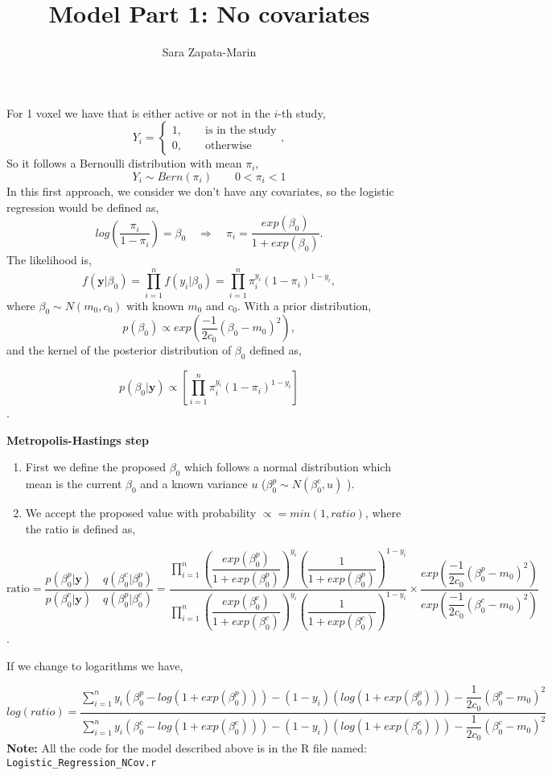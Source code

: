 \documentclass[10pt,a4paper]{article}
\title{Model Part 1: No covariates}
\author{Sara Zapata-Marin}
\begin{document}
\maketitle

For 1 voxel we have that is either active or not in the $i$-th study,
\[ Y_i= 
\begin{cases}
1,\qquad \text{is in the study}\\
0, \qquad \text{otherwise}
\end{cases},
\]
So it follows a Bernoulli distribution with mean $\pi_i$,
\[Y_i \sim Bern(\pi_i) \qquad 0<\pi_i <1\]
In this first approach, we consider we don't have any covariates, so the logistic regression would be defined as,
\[ log \left(\dfrac{\pi_i}{1-\pi_i} \right)=\beta_0 \quad \Rightarrow  \quad \pi_i = \dfrac{exp(\beta_0)}{1+ exp(\beta_0)}. \]
The likelihood is,
\[ f(\textbf{y}| \beta_0)= \prod_{i=1}^{n} f(y_i| \beta_0)=\prod_{i=1}^{n} \pi_i^{y_i}(1-\pi_i)^{1-y_i},\]
where $ \beta_0 \sim N(m_0,c_0) $ with known $m_0$ and $c_0$.
With a prior distribution,
\[
p(\beta_0)\propto exp\left( \dfrac{-1}{2c_0}(\beta_0-m_0)^2 \right),
\]
and the kernel of the posterior distribution of $\beta_0$ defined as,

\[p(\beta_0|\textbf{y})\propto \left[ \prod_{i=1}^{n} \pi_i^{y_i}(1-\pi_i)^{1-y_i} \right]\].

\textbf{Metropolis-Hastings step}

\begin{enumerate}
\item First we define the proposed $\beta_0$ which follows a normal distribution which mean is the current $\beta_0$ and a known variance $u$ ($\beta_0^p \sim N(\beta_0^c,u)$ ).
\item We accept the proposed value with probability $\propto = min(1, ratio)$, where the ratio is defined as,
\end{enumerate}

\[ \text{ratio}=\dfrac{p(\beta_0^p|\textbf{y})\quad q(\beta_0^c|\beta_0^p)}{p(\beta_0^c|\textbf{y}) \quad q(\beta_0^p|\beta_0^c)}=\dfrac{\prod_{i=1}^n\left(\dfrac{exp(\beta_0^p)}{1+exp(\beta_0^p)}\right)^{y_i}\left( \dfrac{1}{1+exp(\beta_0^p)}\right)^{1-y_i}}{\prod_{i=1}^n\left(\dfrac{exp(\beta_0^c)}{1+exp(\beta_0^c)}\right)^{y_i}\left( \dfrac{1}{1+exp(\beta_0^c)}\right)^{1-y_i}}\times \dfrac{exp\left(\dfrac{-1}{2c_0}(\beta_0^p-m_0)^2\right)}{exp\left(\dfrac{-1}{2c_0}(\beta_0^c-m_0)^2\right)}\].

If we change to logarithms we have,

\[ log(ratio)=
 \dfrac{\sum_{i=1}^n y_i(\beta_0^p-log(1+exp(\beta_0^p)))- (1-y_i)(log(1+exp(\beta_0^p)))-\dfrac{1}{2c_0}(\beta_0^p-m_0)^2}{\sum_{i=1}^n y_i(\beta_0^c-log(1+exp(\beta_0^c)))- (1-y_i)(log(1+exp(\beta_0^c)))-\dfrac{1}{2c_0}(\beta_0^c-m_0)^2}
\]
\textbf{Note:} All the code for the model described above is in the R file named: \texttt{Logistic\_Regression\_NCov.r}
\end{document}
